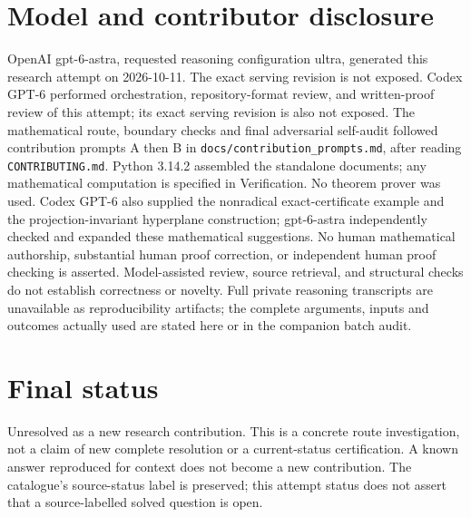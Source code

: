 \documentclass[11pt]{article}
\begin{document}
\section{Model and contributor disclosure}
OpenAI gpt-6-astra, requested reasoning configuration ultra, generated this research
attempt on 2026-10-11. The exact serving revision is not exposed. Codex GPT-6
performed orchestration, repository-format review, and written-proof review of this attempt; its exact serving revision
is also not exposed. The mathematical route, boundary checks and final adversarial
self-audit followed contribution prompts A then B in
\texttt{docs/contribution\_prompts.md}, after reading \texttt{CONTRIBUTING.md}.
Python 3.14.2 assembled the standalone documents; any mathematical computation is
specified in Verification. No theorem prover was used. Codex GPT-6 also supplied the nonradical exact-certificate example and the projection-invariant hyperplane construction; gpt-6-astra independently checked and expanded these mathematical suggestions. No human mathematical
authorship, substantial human proof correction, or independent human proof checking
is asserted. Model-assisted review, source retrieval, and structural checks do not
establish correctness or novelty. Full private reasoning transcripts are unavailable
as reproducibility artifacts; the complete arguments, inputs and outcomes actually
used are stated here or in the companion batch audit.
\section{Final status}
Unresolved as a new research contribution. This is a concrete route investigation,
not a claim of new complete resolution or a current-status certification. A known
answer reproduced for context does not become a new contribution. The catalogue's
source-status label is preserved; this attempt status does not assert that a
source-labelled solved question is open.
\end{document}

